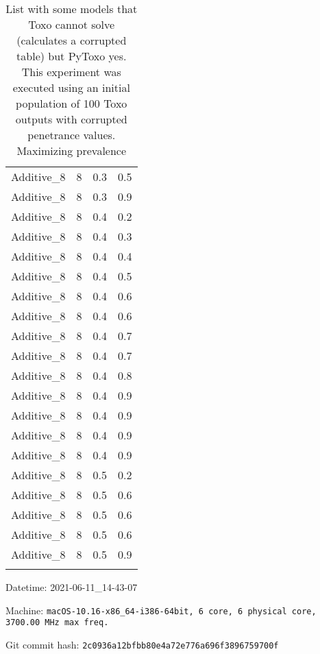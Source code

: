 \documentclass{article}
\begin{document}
\begin{longtable}[H]{lrrr}
 Additive\_8 &       8 &   0.3 &            0.5 \\
 Additive\_8 &       8 &   0.3 &            0.9 \\
 Additive\_8 &       8 &   0.4 &            0.2 \\
 Additive\_8 &       8 &   0.4 &            0.3 \\
 Additive\_8 &       8 &   0.4 &            0.4 \\
 Additive\_8 &       8 &   0.4 &            0.5 \\
 Additive\_8 &       8 &   0.4 &            0.6 \\
 Additive\_8 &       8 &   0.4 &            0.6 \\
 Additive\_8 &       8 &   0.4 &            0.7 \\
 Additive\_8 &       8 &   0.4 &            0.7 \\
 Additive\_8 &       8 &   0.4 &            0.8 \\
 Additive\_8 &       8 &   0.4 &            0.9 \\
 Additive\_8 &       8 &   0.4 &            0.9 \\
 Additive\_8 &       8 &   0.4 &            0.9 \\
 Additive\_8 &       8 &   0.4 &            0.9 \\
 Additive\_8 &       8 &   0.5 &            0.2 \\
 Additive\_8 &       8 &   0.5 &            0.6 \\
 Additive\_8 &       8 &   0.5 &            0.6 \\
 Additive\_8 &       8 &   0.5 &            0.6 \\
 Additive\_8 &       8 &   0.5 &            0.9 \\
\hline

\caption{List with some models that Toxo cannot solve (calculates a corrupted table) but PyToxo yes. This experiment was executed using an initial population of 100 Toxo outputs with corrupted penetrance values. Maximizing prevalence}
\end{longtable}
Datetime: 2021-06-11\_14-43-07

Machine: \texttt{macOS-10.16-x86\_64-i386-64bit, 6 core, 6 physical core, 3700.00 MHz max freq.}

Git commit hash: \texttt{2c0936a12bfbb80e4a72e776a696f3896759700f}
\end{document}
